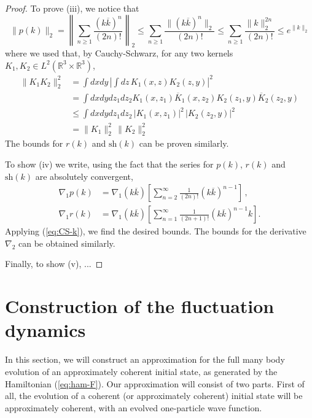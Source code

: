 \documentclass[11pt,a4paper,DIV11]{scrartcl}	%
\newcommand{\bR}{{\mathbb R}}
\begin{document}
\begin{proof}
To prove (iii), we notice that
\[  \| p (k) \|_2 = \left\| \sum_{n\geq 1} \frac{(k\overline{k})^n}{(2n)!} \right\|_2 \leq \sum_{n\geq 1} \frac{ \| (k\overline{k})^n \|_2}{(2n)!}  \leq \sum_{n\geq 1} \frac{ \| k \|^{2n}_2}{(2n)!} \leq e^{\| k \|_2} 
\]
where we used that, by Cauchy-Schwarz, for any two kernels $K_1, K_2 \in L^2 (\bR^3 \times \bR^3)$, 
\begin{equation}\label{eq:CS-k}\begin{split} \| K_1 K_2  \|_2^2 &= \int dx dy \, \left| \int dz \, K_1 (x,z) K_2  (z,y) \right|^2 \\ & = \int dx dy dz_1 dz_2 K_1 (x,z_1) \overline{K}_1 (x,z_2) K_2 (z_1, y) \overline{K}_2 (z_2,y) \\ &\leq \int dx dy dz_1 dz_2 \, |K_1 (x,z_1)|^2 \, |K_2 (z_2, y)|^2 \\ &= \| K_1 \|^2_2 \, \| K_2 \|^2_2 \end{split} \end{equation}
The bounds for $r(k)$ and $\text{sh} (k)$ can be proven similarly. 

To show (iv) we write, using the fact that the series for $p (k)$, $r (k) $ and $\text{sh} (k)$ are absolutely convergent, 
\begin{align*}
    \nabla_1 p (k) & =  \nabla_1 (k \overline{k}) \left[
    \sum_{n=2}^\infty \frac{1}{(2n)!} (k \overline{k})^{n-1} \right] \, , \\
    \nabla_1 r (k) & = \nabla_1 (k \overline{k}) \left[ \sum_{n=1}^\infty \frac{1}{(2n+1)!} (k
    \overline{k})^{n-1} k \right] .
  \end{align*}
Applying (\ref{eq:CS-k}), we find the desired bounds. The bounds for the derivative $\nabla_2$ can be obtained similarly. 

Finally, to show (v), ...
\end{proof}

\section{Construction of the fluctuation dynamics}

In this section, we will construct an approximation for the full many body evolution of an approximately coherent initial state, as generated by the Hamiltonian (\ref{eq:ham-F}). Our approximation will consist 
of two parts. First of all, the evolution of a coherent (or approximately coherent) initial state will be approximately coherent, with an evolved one-particle wave function. 
\end{document}
